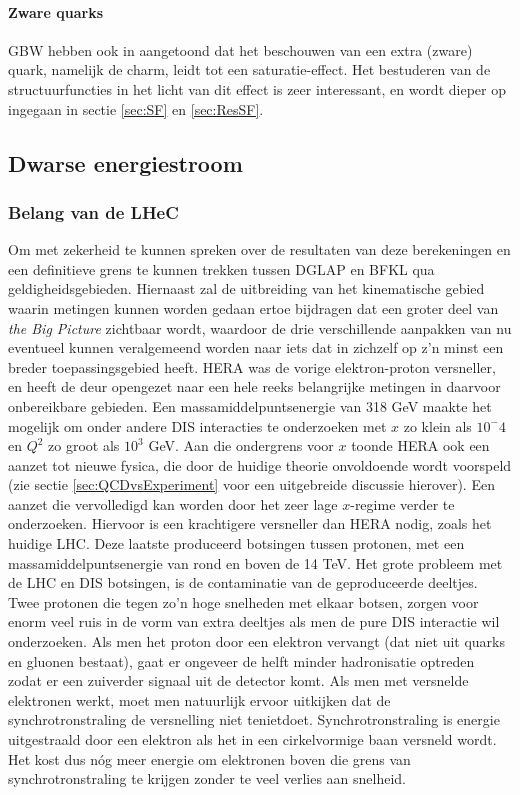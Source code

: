 \documentclass[a4paper,11pt]{article}
\numberwithin{equation}{section} %
\begin{document}
      \paragraph{Zware quarks}
GBW hebben ook in \cite{GBW} aangetoond dat het beschouwen van een extra (zware) quark, namelijk de charm, leidt tot een saturatie-effect.
Het bestuderen van de structuurfuncties in het licht van dit effect is zeer interessant, en wordt dieper op ingegaan in sectie \ref{sec:SF} en \ref{sec:ResSF}.

  \subsection{Dwarse energiestroom}
    \subsubsection{Belang van de LHeC}
Om met zekerheid te kunnen spreken over de resultaten van deze berekeningen en een definitieve grens te kunnen trekken tussen DGLAP en BFKL qua geldigheidsgebieden.
Hiernaast zal de uitbreiding van het kinematische gebied waarin metingen kunnen worden gedaan ertoe bijdragen dat een groter deel van \textit{the Big Picture} zichtbaar wordt, waardoor de drie verschillende aanpakken van nu eventueel kunnen veralgemeend worden naar iets dat in zichzelf op z’n minst een breder toepassingsgebied heeft.
HERA was de vorige elektron-proton versneller, en heeft de deur opengezet naar een hele reeks belangrijke metingen in daarvoor onbereikbare gebieden.
Een massamiddelpuntsenergie van 318 GeV maakte het mogelijk om onder andere DIS  interacties te onderzoeken met $x$ zo klein als $10^-4$ en $Q^2$ zo groot als $10^3$ GeV.
Aan die ondergrens voor $x$ toonde HERA ook een aanzet tot nieuwe fysica, die door de huidige theorie onvoldoende wordt voorspeld (zie sectie \ref{sec:QCDvsExperiment} voor een uitgebreide discussie hierover).
Een aanzet die vervolledigd kan worden door het zeer lage $x$-regime verder te onderzoeken.
Hiervoor is een krachtigere versneller dan HERA nodig, zoals het huidige LHC.
Deze laatste produceerd botsingen tussen protonen, met een massamiddelpuntsenergie van rond en boven de 14 TeV.
Het grote probleem met de LHC en DIS botsingen, is de contaminatie van de geproduceerde deeltjes.
Twee protonen die tegen zo’n hoge snelheden met elkaar botsen, zorgen voor enorm veel ruis in de vorm van extra deeltjes als men de pure DIS interactie wil onderzoeken.
Als men het proton door een elektron vervangt (dat niet uit quarks en gluonen bestaat), gaat er ongeveer de helft minder hadronisatie optreden zodat er een zuiverder signaal uit de detector komt.
Als men met versnelde elektronen werkt, moet men natuurlijk ervoor uitkijken dat de synchrotronstraling de versnelling niet tenietdoet.
Synchrotronstraling is energie uitgestraald door een elektron als het in een cirkelvormige baan versneld wordt.
Het kost dus nóg meer energie om elektronen boven die grens van synchrotronstraling te krijgen zonder te veel verlies aan snelheid.
\end{document}

